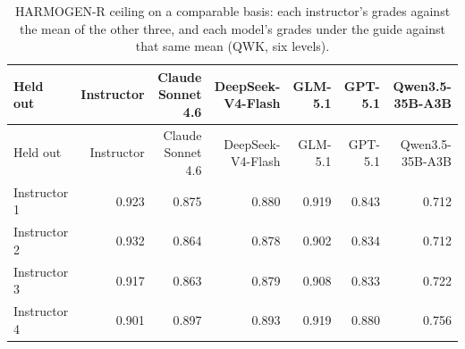 \documentclass[10pt]{article}
\begin{document}
\begingroup\footnotesize
\begin{longtable}{lrrrrrr}
\caption{HARMOGEN-R ceiling on a comparable basis: each instructor's grades against the mean of the other three, and each model's grades under the guide against that same mean (QWK, six levels).}\\
\hline
Held out & Instructor & Claude Sonnet 4.6 & DeepSeek-V4-Flash & GLM-5.1 & GPT-5.1 & Qwen3.5-35B-A3B \\ \hline
\endfirsthead
\hline
Held out & Instructor & Claude Sonnet 4.6 & DeepSeek-V4-Flash & GLM-5.1 & GPT-5.1 & Qwen3.5-35B-A3B \\ \hline
\endhead
Instructor 1 & 0.923 & 0.875 & 0.880 & 0.919 & 0.843 & 0.712 \\
Instructor 2 & 0.932 & 0.864 & 0.878 & 0.902 & 0.834 & 0.712 \\
Instructor 3 & 0.917 & 0.863 & 0.879 & 0.908 & 0.833 & 0.722 \\
Instructor 4 & 0.901 & 0.897 & 0.893 & 0.919 & 0.880 & 0.756 \\
\hline
\end{longtable}
\endgroup
\end{document}
